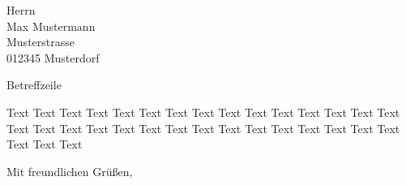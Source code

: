 \documentclass[cca-page,%
paper=a4,
fromphone=on,%
foldmarks=on,%
draft=false,%
fontsize=10pt%
]{scrlttr2}
\begin{document}


\begin{letter}{
Herrn\\
Max Mustermann\\
Musterstrasse\\
012345 Musterdorf\\
}
\opening{Betreffzeile}%

Text Text Text Text Text Text Text Text Text Text Text 
Text Text Text Text Text Text Text Text Text Text Text 
Text Text Text Text Text Text Text Text Text Text Text 

\closing{Mit freundlichen Grüßen,}
\end{letter}
\end{document}

